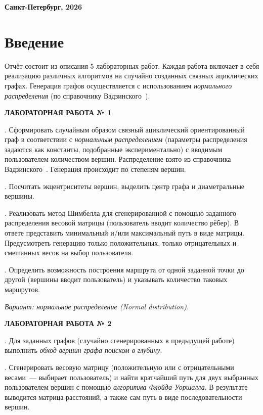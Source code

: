 \documentclass[a4paper,final]{article}
\begin{document}
	\hfill \break
	\hfill \break
	\begin{center} \small\bf{Санкт-Петербург, 2026} \end{center}
	\thispagestyle{empty}

\newpage
\renewcommand{\contentsname}{Содержание}
\tableofcontents


\newpage
\section*{Введение}

\indent Отчёт состоит из описания 5 лабораторных работ. Каждая работа включает в себя реализацию различных алгоритмов на случайно созданных связных ациклических графах. Генерация графов осуществляется с использованием \textit{нормального распределения} (по справочнику Вадзинского~\cite{vadzinsky}).

\medskip
\noindent\textbf{ЛАБОРАТОРНАЯ РАБОТА № 1}

.\; Сформировать случайным образом связный ациклический ориентированный граф в соответствии с \textit{нормальным распределением} (параметры распределения задаются как константы, подобранные экспериментально) с вводимым пользователем количеством вершин. Распределение взято из справочника Вадзинского~\cite{vadzinsky}. Генерация происходит по степеням вершин.

.\; Посчитать экцентриситеты вершин, выделить центр графа и диаметральные вершины.

.\; Реализовать метод Шимбелла для сгенерированной с помощью заданного распределения весовой матрицы (пользователь вводит количество рёбер). В ответе представить минимальный и/или максимальный путь в виде матрицы. Предусмотреть генерацию только положительных, только отрицательных и смешанных весов на выбор пользователя.

.\; Определить возможность построения маршрута от одной заданной точки до другой (вершины вводит пользователь) и указывать количество таковых маршрутов.

\noindent\textit{Вариант: нормальное распределение (Normal distribution).}

\medskip
\noindent\textbf{ЛАБОРАТОРНАЯ РАБОТА № 2}

.\; Для заданных графов (случайно сгенерированных в предыдущей работе) выполнить \textit{обход вершин графа поиском в глубину}.

.\; Сгенерировать весовую матрицу (положительную или с отрицательными весами~--- выбирает пользователь) и найти кратчайший путь для двух выбранных пользователем вершин с помощью \textit{алгоритма Флойда-Уоршалла}. В результате выводится матрица расстояний, а также сам путь в виде последовательности вершин.
\end{document}
